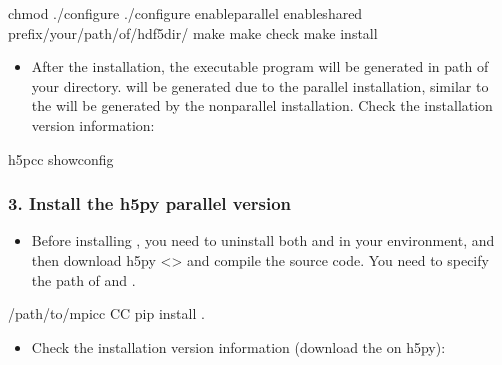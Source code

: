 \documentclass[a4paper,10pt,english,openany]{sphinxmanual}
\begin{document}
\begin{sphinxVerbatim}[commandchars=\\\{\}]
\PYGZdl{} chmod  ./configure  
\PYGZdl{} ./configure \PYGZhy{}\PYGZhy{}enable\PYGZhy{}parallel \PYGZhy{}\PYGZhy{}enable\PYGZhy{}shared \PYGZhy{}\PYGZhy{}prefix/your/path/of/hdf5\PYGZus{}dir/
\PYGZdl{} make
\PYGZdl{} make check
\PYGZdl{} make install
\end{sphinxVerbatim}
\begin{itemize}
\item {} 
After the installation, the executable program will be generated in  path of your  directory.
 will be generated due to the parallel installation, similar to the  will be generated by the non\sphinxhyphen{}parallel
installation. Check the installation version information:

\end{itemize}

\begin{sphinxVerbatim}[commandchars=\\\{\}]
\PYGZdl{} h5pcc \PYGZhy{}showconfig
\end{sphinxVerbatim}


\subsubsection{3. Install the h5py parallel version}
\label{\detokenize{installation:install-the-h5py-parallel-version}}\begin{itemize}
\item {} 
Before installing , you need to uninstall both  and  in your environment, and then download
h5py <> and compile the source code. You need to specify the path of  and .

\end{itemize}

\begin{sphinxVerbatim}[commandchars=\\\{\}]
\PYGZdl{}  /path/to/mpicc   
\PYGZdl{}  \PYGZpc{}CC
\PYGZdl{}  
\PYGZdl{}  
\PYGZdl{} pip install .
\end{sphinxVerbatim}
\begin{itemize}
\item {} 
Check the installation version information (download the  on h5py):

\end{itemize}
\end{document}
